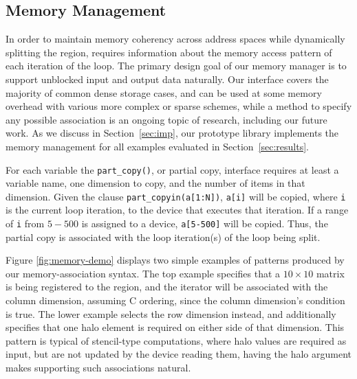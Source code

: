 \subsection{Memory Management}
\label{sec:design:memory}

In order to maintain memory coherency across address spaces while dynamically
splitting the region, \tsar requires information about the memory access
pattern of each iteration of the loop. The primary design goal of our memory
manager is to support unblocked input and output data naturally.  Our
interface covers the majority of common dense storage cases, and can be used
at some memory overhead with various more complex or sparse schemes,  while a
method to specify any possible association is an ongoing topic of research,
including our future work. As we discuss in Section~\ref{sec:imp}, our
prototype library implements the memory management for all examples evaluated
in Section~\ref{sec:results}.

For each variable the \verb#part_copy()#, or partial copy, interface requires at
least a variable name, one dimension to copy, and the number of items in that
dimension.  Given the clause \verb#part_copyin(a[1:N])#, \verb#a[i]# will be
copied, where \verb#i# is the current loop iteration, to the device that
executes that iteration. If a range of \verb#i# from $5-500$ is assigned
to a device, \verb#a[5-500]# will be copied.  Thus, the partial copy is
associated with the loop iteration(s) of the loop being split.


Figure \ref{fig:memory-demo} displays two simple examples of patterns produced
by our memory-association syntax.  The top example specifies that a
$10\times10$ matrix is being registered to the region, and the iterator will
be associated with the column dimension, assuming C ordering, since the column
dimension's condition is true.  The lower example selects the row dimension
instead, and additionally specifies that one halo element is required on
either side of that dimension.  This pattern is typical of stencil-type
computations, where halo values are required as input, but are not updated
by the device reading them, having the halo argument makes supporting such
associations natural.

